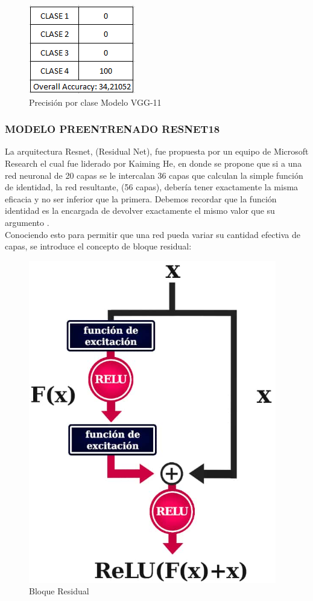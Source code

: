 			\begin{figure}[ht]
				\centering
				\includegraphics[scale=0.6]{Figs/52.png}
				\caption{Precisión por clase Modelo VGG-11}
				\label{fig:clase_VGG11}
			\end{figure}
		
			\newpage
			\subsubsection{\MakeUppercase{Modelo preentrenado RESNET18}}
				La arquitectura Resnet, (Residual Net), fue propuesta por un equipo de Microsoft Research el cual fue liderado por Kaiming He, en donde se propone que si a una red neuronal de 20 capas se le intercalan 36 capas que calculan la simple función de identidad, la red resultante, (56 capas), debería tener exactamente la misma eficacia y no ser inferior que la primera. Debemos recordar que la función identidad es la encargada de devolver exactamente el mismo valor que su argumento \cite{ref_4}.\\
				
				Conociendo esto para permitir que una red pueda variar su cantidad efectiva de capas, se introduce el concepto de bloque residual:
	
				\begin{figure}[ht]
					\centering
					\includegraphics[scale=0.6]{Figs/67.png}
					\caption{Bloque Residual}
					\label{fig:Bloque}
				\end{figure}
			
